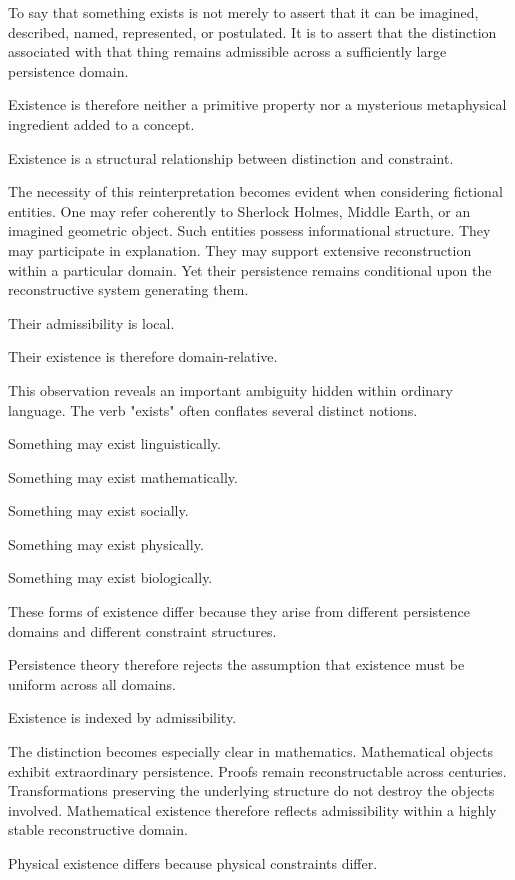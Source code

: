 \documentclass[12pt,oneside]{article}
\theoremstyle{definition}
\begin{document}
To say that something exists is not merely to assert that it can be imagined, described, named, represented, or postulated. It is to assert that the distinction associated with that thing remains admissible across a sufficiently large persistence domain.

Existence is therefore neither a primitive property nor a mysterious metaphysical ingredient added to a concept.

Existence is a structural relationship between distinction and constraint.

The necessity of this reinterpretation becomes evident when considering fictional entities. One may refer coherently to Sherlock Holmes, Middle Earth, or an imagined geometric object. Such entities possess informational structure. They may participate in explanation. They may support extensive reconstruction within a particular domain. Yet their persistence remains conditional upon the reconstructive system generating them.

Their admissibility is local.

Their existence is therefore domain-relative.

This observation reveals an important ambiguity hidden within ordinary language. The verb "exists" often conflates several distinct notions.

Something may exist linguistically.

Something may exist mathematically.

Something may exist socially.

Something may exist physically.

Something may exist biologically.

These forms of existence differ because they arise from different persistence domains and different constraint structures.

Persistence theory therefore rejects the assumption that existence must be uniform across all domains.

Existence is indexed by admissibility.

The distinction becomes especially clear in mathematics. Mathematical objects exhibit extraordinary persistence. Proofs remain reconstructable across centuries. Transformations preserving the underlying structure do not destroy the objects involved. Mathematical existence therefore reflects admissibility within a highly stable reconstructive domain.

Physical existence differs because physical constraints differ.
\end{document}
